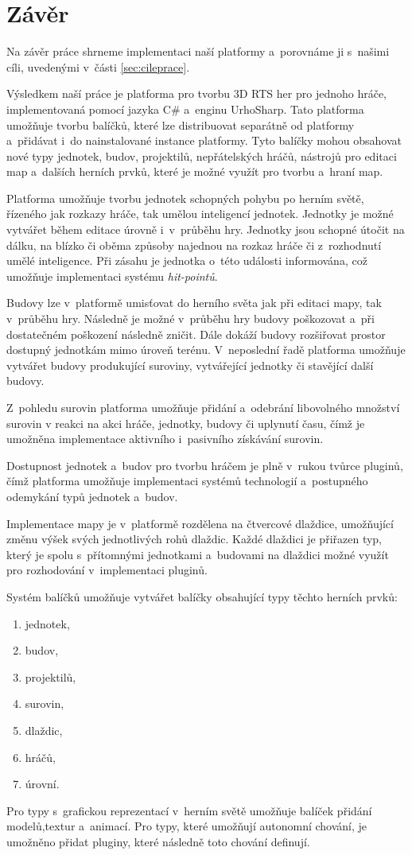 \chapter*{Závěr}
Na závěr práce shrneme implementaci naší platformy a~porovnáme ji s~našimi cíli, uvedenými v~části \ref{sec:cileprace}.

Výsledkem naší práce je platforma pro tvorbu 3D RTS her pro jednoho hráče, implementovaná pomocí jazyka C\# a~enginu UrhoSharp. Tato platforma umožňuje tvorbu balíčků, které lze distribuovat separátně od platformy a~přidávat i~do nainstalované instance platformy. Tyto balíčky mohou obsahovat nové typy jednotek, budov, projektilů, nepřátelských hráčů, nástrojů pro editaci map a~dalších herních prvků, které je možné využít pro tvorbu a~hraní map. 

Platforma umožňuje tvorbu jednotek schopných pohybu po herním světě, řízeného jak rozkazy hráče, tak umělou inteligencí jednotek. Jednotky je možné vytvářet během editace úrovně i~v~průběhu hry. Jednotky jsou schopné útočit na dálku, na blízko či oběma způsoby najednou na rozkaz hráče či z~rozhodnutí umělé inteligence. Při zásahu je jednotka o~této události informována, což umožňuje implementaci systému \textit{hit-pointů}.

Budovy lze v~platformě umisťovat do herního světa jak při editaci mapy, tak v~průběhu hry. Následně je možné v~průběhu hry budovy poškozovat a~při dostatečném poškození následně zničit. Dále dokáží budovy rozšiřovat prostor dostupný jednotkám mimo úroveň terénu. V~neposlední řadě platforma umožňuje vytvářet budovy produkující suroviny, vytvářející jednotky či stavějící další budovy.

Z~pohledu surovin platforma umožňuje přidání a~odebrání libovolného množství surovin v reakci na akci hráče, jednotky, budovy či uplynutí času, čímž je umožněna implementace aktivního i~pasivního získávání surovin.

Dostupnost jednotek a~budov pro tvorbu hráčem je plně v~rukou tvůrce pluginů, čímž platforma umožňuje implementaci systémů technologií a~postupného odemykání typů jednotek a~budov.

Implementace mapy je v~platformě rozdělena na čtvercové dlaždice, umožňující změnu výšek svých jednotlivých rohů dlaždic. Každé dlaždici je přiřazen typ, který je spolu s~přítomnými jednotkami a~budovami na dlaždici možné využít pro rozhodování v~implementaci pluginů.

Systém balíčků umožňuje vytvářet balíčky obsahující typy těchto herních prvků:
\begin{enumerate}
	\item jednotek,
	\item budov,
	\item projektilů,
	\item surovin,
	\item dlaždic,
	\item hráčů,
	\item úrovní.	
\end{enumerate} 
Pro typy s~grafickou reprezentací v~herním světě umožňuje balíček přidání modelů,textur a~animací. Pro typy, které umožňují autonomní chování, je umožněno přidat pluginy, které následně toto chování definují.

